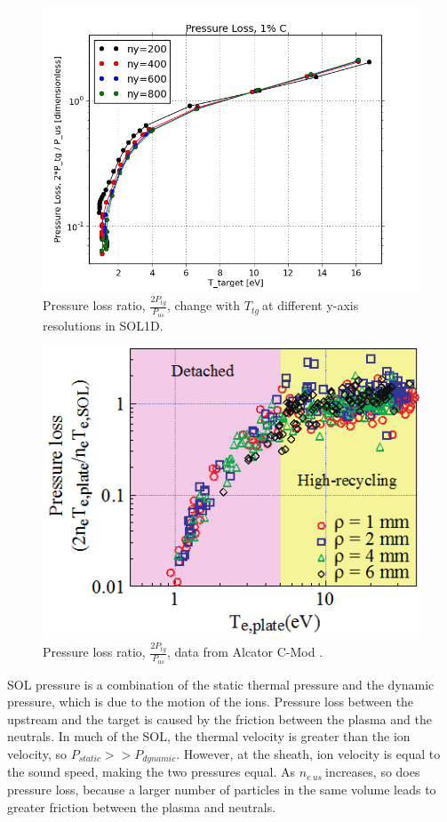 \documentclass[11pt]{article}  %
\providecommand{\neus}{$n_{e~us}~$} %
\providecommand{\Ttg}{$T_{tg}~$} %
\begin{document}
\begin{figure}
\includegraphics[scale=0.5]{Figures/sol1d/PL_IMPCOMBO2logy.png}
\centering
\caption{Pressure loss ratio, $\frac{2P_{tg}}{P_{us}}$, change with \Ttg at different y-axis resolutions in SOL1D.}\label{figPL_IMPCOMBO2logy}
\end{figure}

\begin{figure}
\includegraphics[scale=0.7]{Figures/PlossAlcator.png}
\centering
\caption{Pressure loss ratio, $\frac{2P_{tg}}{P_{us}}$, data from Alcator C-Mod \cite{Lipschultz2007}.}\label{figPlossAlcator}
\end{figure}

SOL pressure is a combination of the static thermal pressure and the dynamic pressure, which is due to the motion of the ions. Pressure loss between the upstream and the target is caused by the friction between the plasma and the neutrals. In much of the SOL, the thermal velocity is greater than the ion velocity, so $P_{static} >> P_{dynamic}$. However, at the sheath, ion velocity is equal to the sound speed, making the two pressures equal. As \neus increases, so does pressure loss, because a larger number of particles in the same volume leads to greater friction between the plasma and neutrals.
\end{document}
